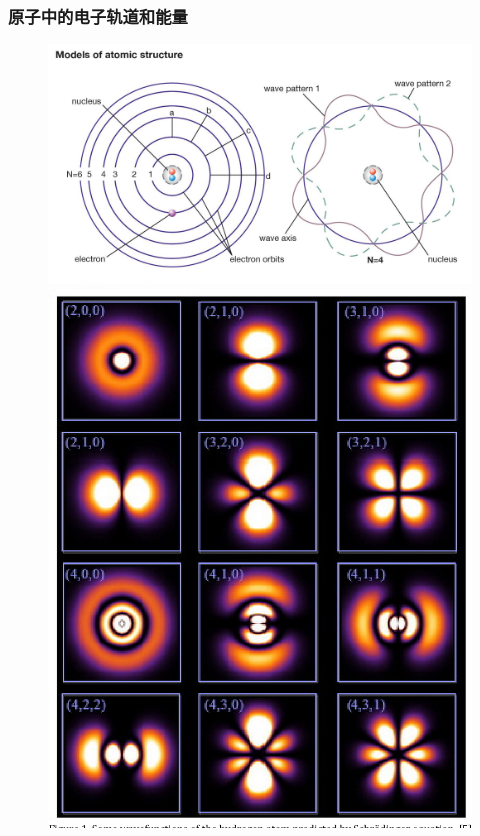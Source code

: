 \frame
{
	\frametitle{原子中的电子轨道和能量}
\begin{minipage}{0.43\textwidth}
\begin{figure}[h!]
	\vspace{-14.8pt}
\centering
\includegraphics[height=0.57\textwidth,width=1.00\textwidth,viewport=0 50 1680 1000,clip]{Figures/electron-theory-Bohr-point-mass-energy-levels.jpg}
\includegraphics[height=1.23\textwidth,width=1.00\textwidth,viewport=0 10 1250 1500,clip]{Figures/wave_function.png}

\end{figure}
\end{minipage}}
